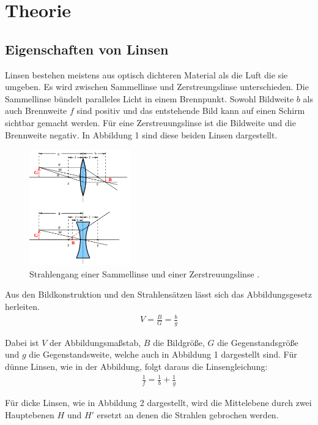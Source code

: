 \section{Theorie}
\label{sec:Theorie}

\subsection{Eigenschaften von Linsen}
Linsen bestehen meistens aus optisch dichteren Material als die Luft die sie
umgeben. Es wird zwischen Sammellinse und Zerstreungslinse unterschieden. Die
Sammellinse bündelt paralleles Licht in einem Brennpunkt. Sowohl Bildweite $b$ als auch
Brennweite $f$ sind positiv und das entstehende Bild kann auf einen Schirm sichtbar gemacht werden.
Für eine Zerstreuungslinse ist die Bildweite und die Brennweite negativ. In Abbildung 1 sind diese
beiden Linsen dargestellt.

\begin{figure}[H]
  \centering
  \includegraphics[height=5cm]{linsen.PNG}
  \caption{Strahlengang einer Sammellinse und einer Zerstreuungslinse \cite{sample}.}
  \label{fig:biegungbild1}
\end{figure}

Aus den Bildkonstruktion und den Strahlensätzen lässt sich das Abbildungsgesetz herleiten.
\begin{align}
  V =\frac{B}{G} = \frac{b}{g}
\end{align}

Dabei ist $V$ der Abbildungsmaßstab, $B$ die Bildgröße, $G$ die Gegenstandsgröße und $g$ die Gegenstandsweite, welche
auch in Abbildung 1 dargestellt sind.
Für dünne Linsen, wie in der Abbildung, folgt daraus die Linsengleichung:
\begin{align}
  \frac{1}{f} = \frac{1}{b} + \frac{1}{g}
\end{align}

Für dicke Linsen, wie in Abbildung 2 dargestellt, wird die Mittelebene durch zwei Hauptebenen $H$ und $H'$ ersetzt
an denen die Strahlen gebrochen werden.

